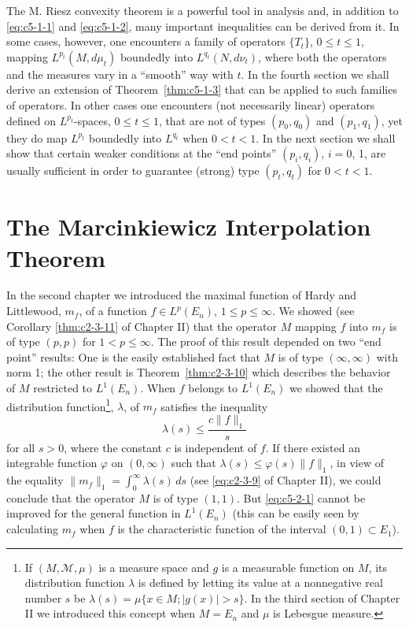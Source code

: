 The M. Riesz convexity theorem is a powerful tool in analysis and, in addition
to \eqref{eq:c5-1-1} and \eqref{eq:c5-1-2}, many important inequalities can be
derived from it. In some cases, however, one encounters a family of operators
$\{T_{t}\}$, $0 \leq t \leq 1$, mapping $L^{p_{t}}(M, d\mu_{t})$ boundedly into
$L^{q_{t}}(N, d\nu_{t})$, where both the operators and the measures vary in a
``smooth'' way with $t$. In the fourth section we shall derive an extension of
Theorem~\ref{thm:c5-1-3} that can be applied to such families of operators. In
other cases one encounters (not necessarily linear) operators defined on
$L^{p_{t}}$-spaces, $0 \leq t \leq 1$, that are not of types $(p_{0}, q_{0})$
and $(p_{1}, q_{1})$, yet they do map $L^{p_{t}}$ boundedly into $L^{q_{t}}$
when $0 < t < 1$. In the next section we shall show that certain weaker
conditions at the ``end points'' $(p_{i}, q_{i})$, $i = 0$, 1, are usually
sufficient in order to guarantee (strong) type $(p_{t}, q_{t})$ for
$0 < t < 1$.

\section{The Marcinkiewicz Interpolation Theorem}

In the second chapter we introduced the maximal function of Hardy and
Littlewood, $m_{f}$, of a function $f \in L^{p}(E_{n})$, $1 \leq p \leq \infty$.
We showed (see Corollary \ref{thm:c2-3-11} of Chapter II) that the operator
$M$ mapping $f$ into $m_{f}$ is of type $(p, p)$ for $1 < p \leq \infty$. The
proof of this result depended on two ``end point'' results: One is the easily
established fact that $M$ is of type $(\infty, \infty)$ with norm 1; the other
result is Theorem~\ref{thm:c2-3-10} which describes the behavior of $M$
restricted to $L^{1}(E_{n})$. When $f$ belongs to $L^{1}(E_{n})$ we showed that
the distribution
function\footnote{If $(M, \mathcal{M}, \mu)$ is a measure space and $g$ is a
measurable function on $M$, its distribution function $\lambda$ is defined by
letting its value at a nonnegative real number $s$ be
$\lambda(s) = \mu\{x \in M ; |g(x)| > s\}$. In the third section of Chapter II
we introduced this concept when $M = E_{n}$ and $\mu$ is Lebesgue measure.},
$\lambda$, of $m_{f}$ satisfies the inequality
\begin{equation}\label{eq:c5-2-1}
\lambda(s)\leq\frac{c\|f\|_{1}}{s}
\end{equation}
for all $s > 0$, where the constant $c$ is independent of $f$. If there existed
an integrable function $\varphi$ on $(0, \infty)$ such that
$\lambda(s) \leq \varphi(s)\|f\|_{1}$, in view of the equality
$\|m_{f}\|_{1} = \int_{0}^{\infty}\lambda(s)\,ds$ (see \eqref{eq:c2-3-9} of
Chapter II), we could conclude that the operator $M$ is of type $(1, 1)$. But
\eqref{eq:c5-2-1} cannot be improved for the general function in $L^{1}(E_{n})$
(this can be easily seen by calculating $m_{f}$ when $f$ is the characteristic
function of the interval $(0, 1) \subset E_{1}$).

